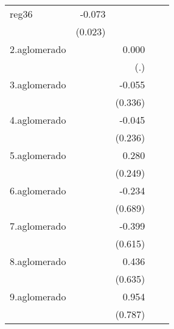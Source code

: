 {\begin{longtable}{l*{4}{D{.}{.}{-1}}}
\addlinespace
reg36       &      -0.073\sym{**} &                     &                     &                     \\
            &     (0.023)         &                     &                     &                     \\
\addlinespace
2.aglomerado&                     &       0.000         &                     &                     \\
            &                     &         (.)         &                     &                     \\
\addlinespace
3.aglomerado&                     &      -0.055         &                     &                     \\
            &                     &     (0.336)         &                     &                     \\
\addlinespace
4.aglomerado&                     &      -0.045         &                     &                     \\
            &                     &     (0.236)         &                     &                     \\
\addlinespace
5.aglomerado&                     &       0.280         &                     &                     \\
            &                     &     (0.249)         &                     &                     \\
\addlinespace
6.aglomerado&                     &      -0.234         &                     &                     \\
            &                     &     (0.689)         &                     &                     \\
\addlinespace
7.aglomerado&                     &      -0.399         &                     &                     \\
            &                     &     (0.615)         &                     &                     \\
\addlinespace
8.aglomerado&                     &       0.436         &                     &                     \\
            &                     &     (0.635)         &                     &                     \\
\addlinespace
9.aglomerado&                     &       0.954         &                     &                     \\
            &                     &     (0.787)         &                     &                     \\

\end{longtable}}
